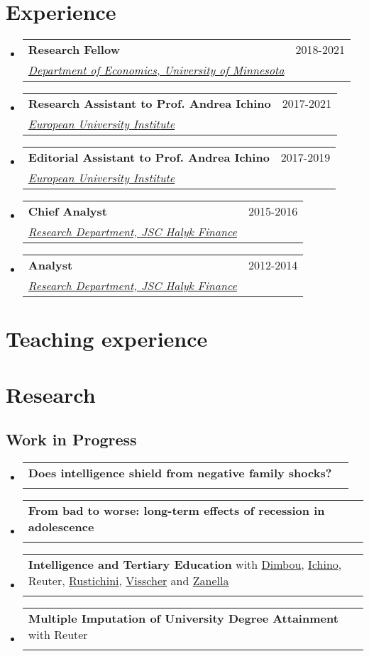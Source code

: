 \documentclass[a4, 11pt]{article}
\makeatletter
\newcommand{\resumeSubheading}[4]{
      \vspace{-2pt}\item
        \begin{tabular*}{0.97\textwidth}[t]{l@{\extracolsep{\fill}}r}
          \textbf{#1} & #2 \\
          \textit{\small#3} & \textit{\small #4} \\
        \end{tabular*}
    }
\newcommand{\resumePublicationHeading}[3]{
        \item
        \begin{tabularx}{0.97\textwidth}{X@{\extracolsep{2em}}r}
          #1 & #2 \\
          \multicolumn{2}{l}{\textit{\small#3}}
        \end{tabularx}
    }
\newcommand{\resumeSubHeadingListStart}{\begin{itemize}[leftmargin=0.15in, label={}]}
\newcommand{\resumeSubHeadingListEnd}{\end{itemize}}
\makeatother
\begin{document}
    \section{Experience}
  \resumeSubHeadingListStart
        \resumeSubheading
          {Research Fellow}
          {2018-2021}
          {\href{https://cla.umn.edu/economics}{Department of Economics, University of Minnesota} }
          {}
        \resumeSubheading
          {Research Assistant to Prof. Andrea Ichino}
          {2017-2021}
          {\href{https://www.eui.eu}{European University Institute} }
          {}
        \resumeSubheading
          {Editorial Assistant to Prof. Andrea Ichino}
          {2017-2019}
          {\href{https://www.eui.eu}{European University Institute} }
          {}
        \resumeSubheading
          {Chief Analyst}
          {2015-2016}
          {\href{https://www.halykfinance.kz}{Research Department, JSC Halyk Finance} }
          {}
        \resumeSubheading
          {Analyst}
          {2012-2014}
          {\href{https://www.halykfinance.kz}{Research Department, JSC Halyk Finance} }
          {}
    \resumeSubHeadingListEnd


    \section{Teaching experience}
  


    \section*{Research}\subsection{Work in Progress}
        \resumeSubHeadingListStart    \resumePublicationHeading
      { \textbf{Does intelligence shield from negative family shocks?} }
      {}
      {}    \resumePublicationHeading
      { \textbf{From bad to worse: long-term effects of recession in adolescence} }
      {}
      {}    \resumePublicationHeading
      { \textbf{Intelligence and Tertiary Education} with \href{https://researchers.uq.edu.au/researcher/14187}{Dimbou},
      \href{http://www.andreaichino.it}{Ichino},
      Reuter,
      \href{https://sites.google.com/site/aldorustichini/}{Rustichini},
      \href{https://qbi.uq.edu.au/profile/721/peter-visscher}{Visscher} and 
      \href{https://sites.google.com/site/giuliozanella/}{Zanella} }
      {}
      {}    \resumePublicationHeading
      { \textbf{Multiple Imputation of University Degree Attainment} with Reuter }
      {}
      {}\resumeSubHeadingListEnd
\end{document}
